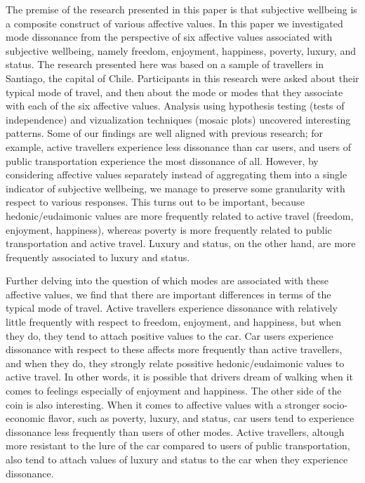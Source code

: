 \documentclass[]{elsarticle} %
\begin{document}
The premise of the research presented in this paper is that subjective
wellbeing is a composite construct of various affective values. In this
paper we investigated mode dissonance from the perspective of six
affective values associated with subjective wellbeing, namely freedom,
enjoyment, happiness, poverty, luxury, and status. The research
presented here was based on a sample of travellers in Santiago, the
capital of Chile. Participants in this research were asked about their
typical mode of travel, and then about the mode or modes that they
associate with each of the six affective values. Analysis using
hypothesis testing (tests of independence) and vizualization techniques
(mosaic plots) uncovered interesting patterns. Some of our findings are
well aligned with previous research; for example, active travellers
experience less dissonance than car users, and users of public
transportation experience the most dissonance of all. However, by
considering affective values separately instead of aggregating them into
a single indicator of subjective wellbeing, we manage to preserve some
granularity with respect to various responses. This turns out to be
important, because hedonic/eudaimonic values are more frequently related
to active travel (freedom, enjoyment, happiness), whereas poverty is
more frequently related to public transportation and active travel.
Luxury and status, on the other hand, are more frequently associated to
luxury and status.

Further delving into the question of which modes are associated with
these affective values, we find that there are important differences in
terms of the typical mode of travel. Active travellers experience
dissonance with relatively little frequently with respect to freedom,
enjoyment, and happiness, but when they do, they tend to attach positive
values to the car. Car users experience dissonance with respect to these
affects more frequently than active travellers, and when they do, they
strongly relate possitive hedonic/eudaimonic values to active travel. In
other words, it is possible that drivers dream of walking when it comes
to feelings especially of enjoyment and happiness. The other side of the
coin is also interesting. When it comes to affective values with a
stronger socio-economic flavor, such as poverty, luxury, and status, car
users tend to experience dissonance less frequently than users of other
modes. Active travellers, altough more resistant to the lure of the car
compared to users of public transportation, also tend to attach values
of luxury and status to the car when they experience dissonance.
\end{document}
